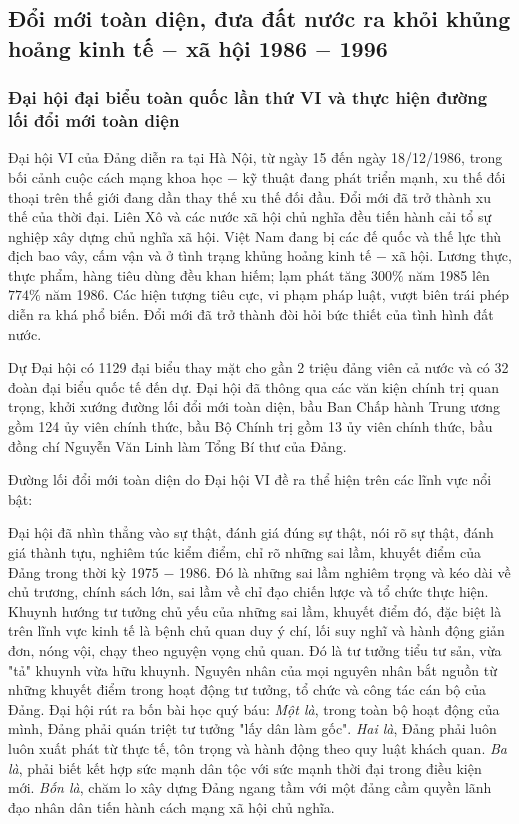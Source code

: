 \subsection{Đổi mới toàn diện, đưa đất nước ra khỏi khủng hoảng kinh tế $-$ xã hội 1986 $-$ 1996}
\subsubsection{Đại hội đại biểu toàn quốc lần thứ VI và thực hiện đường lối đổi mới toàn diện}
Đại hội VI của Đảng diễn ra tại Hà Nội, từ ngày 15 đến ngày 18/12/1986, trong bối cảnh cuộc cách mạng khoa học $-$ kỹ thuật đang phát triển mạnh, xu thế đối thoại trên thế giới đang dần thay thế xu thế đối đầu. Đổi mới đã trở thành xu thế của thời đại. Liên Xô và các nước xã hội chủ nghĩa đều tiến hành cải tổ sự nghiệp xây dựng chủ nghĩa xã hội. Việt Nam đang bị các đế quốc và thế lực thù địch bao vây, cấm vận và ở tình trạng khủng hoảng kinh tế $-$ xã hội. Lương thực, thực phẩm, hàng tiêu dùng đều khan hiếm; lạm phát tăng $300\%$ năm 1985 lên $774\%$ năm 1986. Các hiện tượng tiêu cực, vi phạm pháp luật, vượt biên trái phép diễn ra khá phổ biến. Đổi mới đã trở thành đòi hỏi bức thiết của tình hình đất nước.

Dự Đại hội có 1129 đại biểu thay mặt cho gần 2 triệu đảng viên cả nước và có 32 đoàn đại biểu quốc tế đến dự. Đại hội đã thông qua các văn kiện chính trị quan trọng, khởi xướng đường lối đổi mới toàn diện, bầu Ban Chấp hành Trung ương gồm 124 ủy viên chính thức, bầu Bộ Chính trị gồm 13 ủy viên chính thức, bầu đồng chí Nguyễn Văn Linh làm Tổng Bí thư của Đảng.

Đường lối đổi mới toàn diện do Đại hội VI đề ra thể hiện trên các lĩnh vực nổi bật:

Đại hội đã nhìn thẳng vào sự thật, đánh giá đúng sự thật, nói rõ sự thật, đánh giá thành tựu, nghiêm túc kiểm điểm, chỉ rõ những sai lầm, khuyết điểm của Đảng trong thời kỳ 1975 $-$ 1986. Đó là những sai lầm nghiêm trọng và kéo dài về chủ trương, chính sách lớn, sai lầm về chỉ đạo chiến lược và tổ chức thực hiện. Khuynh hướng tư tưởng chủ yếu của những sai lầm, khuyết điểm đó, đặc biệt là trên lĩnh vực kinh tế là bệnh chủ quan duy ý chí, lối suy nghĩ và hành động giản đơn, nóng vội, chạy theo nguyện vọng chủ quan. Đó là tư tưởng tiểu tư sản, vừa "tả" khuynh vừa hữu khuynh. Nguyên nhân của mọi nguyên nhân bắt nguồn từ những khuyết điểm trong hoạt động tư tưởng, tổ chức và công tác cán bộ của Đảng. Đại hội rút ra bốn bài học quý báu: \textit{Một là}, trong toàn bộ hoạt động của mình, Đảng phải quán triệt tư tưởng "lấy dân làm gốc". \textit{Hai là}, Đảng phải luôn luôn xuất phát từ thực tế, tôn trọng và hành động theo quy luật khách quan. \textit{Ba là}, phải biết kết hợp sức mạnh dân tộc với sức mạnh thời đại trong điều kiện mới. \textit{Bốn là}, chăm lo xây dựng Đảng ngang tầm với một đảng cầm quyền lãnh đạo nhân dân tiến hành cách mạng xã hội chủ nghĩa.

